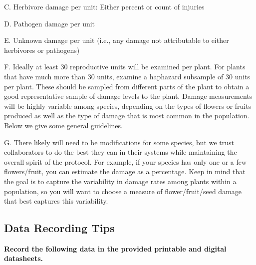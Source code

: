 \documentclass[
  letterpaper,
  DIV=11,
  numbers=noendperiod]{scrreprt}
\begin{document}
C. Herbivore damage per unit: Either percent or count of injuries

D. Pathogen damage per unit

E. Unknown damage per unit (i.e., any damage not attributable to either
herbivores or pathogens)

F. Ideally at least 30 reproductive units will be examined per plant.
For plants that have much more than 30 units, examine a haphazard
subsample of 30 units per plant. These should be sampled from different
parts of the plant to obtain a good representative sample of damage
levels to the plant. Damage measurements will be highly variable among
species, depending on the types of flowers or fruits produced as well as
the type of damage that is most common in the population. Below we give
some general guidelines.

G. There likely will need to be modifications for some species, but we
trust collaborators to do the best they can in their systems while
maintaining the overall spirit of the protocol. For example, if your
species has only one or a few flowers/fruit, you can estimate the damage
as a percentage. Keep in mind that the goal is to capture the
variability in damage rates among plants within a population, so you
will want to choose a measure of flower/fruit/seed damage that best
captures this variability.

\subsection{Data Recording Tips}\label{data-recording-tips}

\textbf{Record the following data in the provided printable and digital
datasheets.}
\end{document}
